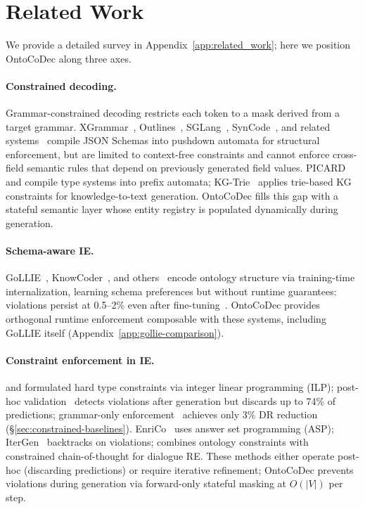\section{Related Work}
\label{sec:related_work}

We provide a detailed survey in Appendix~\ref{app:related_work}; here we position OntoCoDec along three axes.

\paragraph{Constrained decoding.}
Grammar-constrained decoding restricts each token to a mask derived from a target grammar.
XGrammar~\cite{dong2025xgrammar}, Outlines~\cite{willard2023outlines}, SGLang~\cite{zheng2024sglang}, SynCode~\cite{ugare2024syncode}, and related systems~\cite{beurer-kellner2023lmql,park2024grammar,jsonschemabench2025} compile JSON Schemas into pushdown automata for structural enforcement, but are limited to context-free constraints and cannot enforce cross-field semantic rules that depend on previously generated field values.
PICARD~\cite{scholak2021picard} and \citet{pldi2025_type_constrained_codegen} compile type systems into prefix automata; KG-Trie~\cite{luo2025kgtrie} applies trie-based KG constraints for knowledge-to-text generation.
OntoCoDec fills this gap with a stateful semantic layer whose entity registry is populated dynamically during generation.

\paragraph{Schema-aware IE.}
GoLLIE~\cite{sainz2024gollie}, KnowCoder~\cite{knowcoder_acl2024}, and others~\cite{guidex2025,josifoski2022genie,paolini2021tanl,cabot2021rebel,wang2023instructuie,qi2024adelie,fei2022lasuie,lu2022uie,zhou2024universalner} encode ontology structure via training-time internalization, learning schema preferences but without runtime guarantees: violations persist at 0.5--2\% even after fine-tuning~\cite{wadhwa2023revisiting}.
OntoCoDec provides orthogonal runtime enforcement composable with these systems, including GoLLIE itself (Appendix~\ref{app:gollie-comparison}).

\paragraph{Constraint enforcement in IE.}
\citet{roth_yih_2004} and \citet{riedel2010modeling} formulated hard type constraints via integer linear programming (ILP); post-hoc validation~\cite{khorshidi2025odke,spires_2024,ontologx_2025} detects violations after generation but discards up to 74\% of predictions; grammar-only enforcement~\cite{geng2023gcd,boostcd2025} achieves only 3\% DR reduction (\S\ref{sec:constrained-baselines}).
EnriCo~\cite{zaratiana2024enrico} uses answer set programming (ASP); IterGen~\cite{ugare2025itergen} backtracks on violations; \citet{vukovic2024dialogue} combines ontology constraints with constrained chain-of-thought for dialogue RE.
These methods either operate post-hoc (discarding predictions) or require iterative refinement; OntoCoDec prevents violations during generation via forward-only stateful masking at $O(|V|)$ per step.
